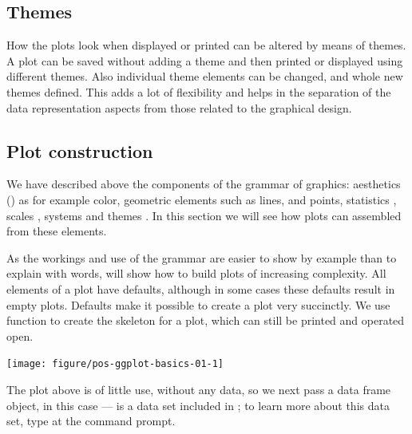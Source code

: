 \documentclass[krantz2]{krantz}\usepackage{knitr}%
\begin{document}
\subsection{Themes}

How the plots look when displayed or printed can be altered by means of themes. A plot can be saved without adding a theme and then printed or displayed using different themes. Also individual theme elements can be changed, and whole new themes defined. This adds a lot of flexibility and helps in the separation of the data representation aspects from those related to the graphical design.

\subsection{Plot construction}
We have described above the components of the grammar of graphics: aesthetics () as for example color, geometric elements  such as lines, and points, statistics , scales ,  systems and themes . In this section we will see how plots can assembled from these elements.

As the workings and use of the grammar are easier to show by example than to explain with words, will show how to build plots of increasing complexity. All elements of a plot have defaults, although in some cases these defaults result in empty plots. Defaults make it possible to create a plot very succinctly. We use function  to create the skeleton for a plot, which can still be printed and operated open.

\begin{knitrout}\footnotesize
{}\color{fgcolor}\begin{kframe}
\begin{alltt}
\hlstd{()}
\end{alltt}
\end{kframe}

{\centering \texttt{[image: figure/pos-ggplot-basics-01-1]} 

}



\end{knitrout}

The plot above is of little use, without any data, so we next pass a data frame object, in this case --- is a data set included in \Rlang; to learn more about this data set, type  at the \Rlang command prompt.
\end{document}
